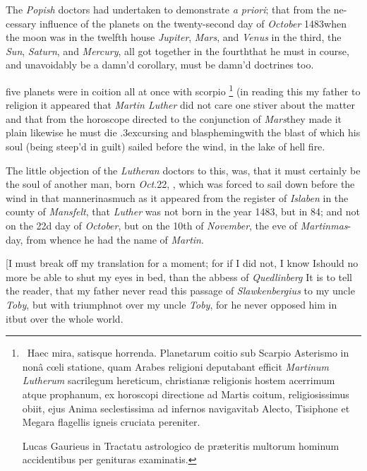 \documentclass{article}
\begin{document}
The \textit{Popish} doctors had undertaken to demonstrate
\textit{a priori}; that from the ne- cessary influence of the
planets on the twenty-second day of \textit{October}
1483\tsh when the moon was in the twelfth house\break
\tsk \textit{Jupiter}, \textit{Mars}, and \textit{Venus} in the third,
the \textit{Sun}, \textit{Saturn}, and \textit{Mercury}, all got together
in the fourth\tsk that he must in course, and unavoidably
be a damn’d\break
{}
corollary, must be damn’d doctrines too.

\noindent
{}
five planets were in coition all at once
with scorpio \footnote{\ Haec mira, satisque horrenda. \vrule height 12pt width 0pt
Planetarum coitio sub Scarpio Asterismo in nonâ cœli
statione, quam Arabes religioni deputabant efficit
\textit{Martinum Lutherum} sacrilegum hereticum, christianæ
religionis hostem acerrimum atque prophanum, ex horoscopi
directione ad Martis coitum, religiosissimus obiit, ejus
Anima seclestissima ad infernos navigavit\tsk ab Alecto,
Tisiphone et Megara flagellis igneis cruciata pereniter.

\tsk Lucas Gaurieus in Tractatu astrologico de\break
præteritis multorum hominum accidentibus per genituras examinatis.} (in reading this my
father
to religion\tsk
it appeared that \textit{Martin Lu\-ther} did not care one stiver about the matter
\tsk and that from the horoscope directed to the conjunction of \textit{Mars}\tsk they
made it plain likewise he must die\break
\lower.3ex\hbox{c}ursing and
blaspheming\tsk with the blast of
which his soul (being steep’d in guilt) sailed before the wind, in the lake of
\break
hell fire.

The little objection of the \textit{Lutheran}\break
doctors to this, was, that it must certainly be the
soul of another man, born \textit{Oct}.\@ 22,\break
\null{}, which was forced to sail down before the wind in that manner\tsk inasmuch as it
appeared from the register of \textit{Islaben} in the county of
\textit{Mansfelt}, that \textit{Luther} was not born in the year 1483,
but in 84; and not on the 22d day of \textit{October}, but on the
10th of \textit{November}, the eve of \textit{Martinmas}-day, from
whence he had the name of \textit{Martin}.

[\tsh I must break off my translation for a moment; for if I
did not, I know I\break should no more be able to shut my
eyes in bed, than the abbess of \textit{Quedlinberg}\tsk\break
It is to tell the reader, that my father never read this
passage of \textit{Slawkenbergius} to my uncle
\textit{Toby}, but with triumph\tsk not over my uncle
\textit{Toby}, for he never opposed him in it\tsk but over
the whole world.
\end{document}
